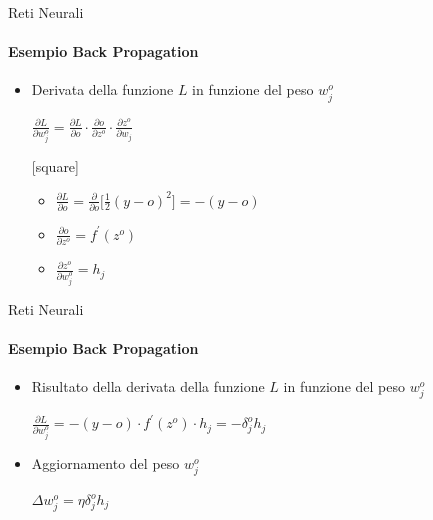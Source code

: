 \documentclass[
 ]{beamer}
\begin{document}
\begin{frame}{Reti Neurali}
    \framesubtitle{Esempio Back Propagation}
    \begin{itemize} [<+->]
        \setlength\itemsep{2em}
        \item \large Derivata della funzione $L$ in funzione del peso $w_j^{o}$ 
        
        \bigskip
        \begin{center}
         \large $ \frac{\partial L}{\partial w_j^{o}} =  \frac{\partial L}{\partial o} \cdot \frac{\partial o}{\partial z^{o}} \cdot \frac{\partial z^{o}}{\partial w_j}$         
         \end{center}
         
         \bigskip
         [square]
         \begin{itemize}
            \setlength\itemsep{2.5em}
            \item \large $\frac{\partial L}{\partial o} = \frac{\partial}{\partial o} \big[ \frac{1}{2}(y - o)^{2} \big] = -(y - o)$
            \item \large $\frac{\partial o}{\partial z^{o}} = f^{\prime}(z^{o})$
            \item \large $\frac{\partial z^{o}}{\partial w_j^{o}} = h_j$ 
         \end{itemize}
    \end{itemize}
\end{frame}


\begin{frame}{Reti Neurali}
    \framesubtitle{Esempio Back Propagation}
    \begin{itemize} [<+->]
        \setlength\itemsep{3em}
        \item \large Risultato della derivata della funzione $L$ in funzione del peso $w_j^{o}$
        \bigskip
        \begin{center}
         \large $ \frac{\partial L}{\partial w_j^{o}} =  -(y - o) \cdot f^{\prime}(z^{o}) \cdot h_j = -\delta_j^{o}h_j$         
         \end{center}
         \item \large Aggiornamento del peso $w_j^{o}$
         \bigskip
         \begin{center}
         \large $ \Delta w_j^{o} = \eta\delta_j^{o}h_j$         
         \end{center}       
    \end{itemize}
\end{frame}
\end{document}
